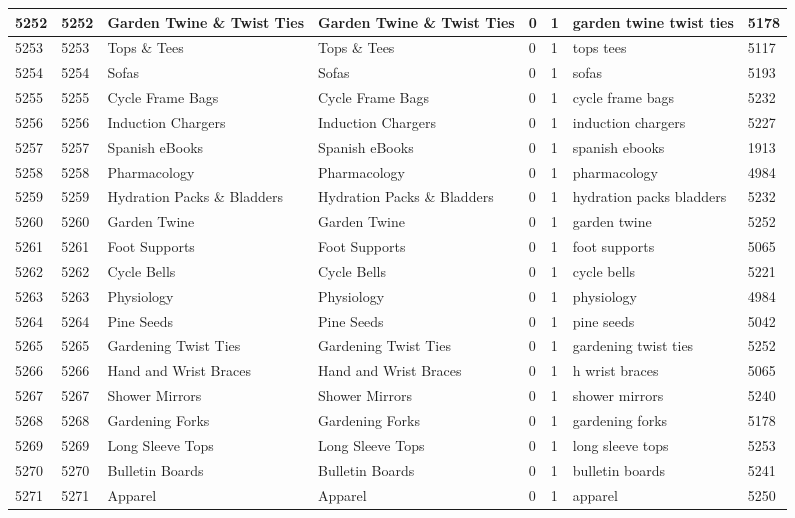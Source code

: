 \begin{longtable}{|l|l|l|l|l|l|l|l|}
5252 & 5252 & Garden Twine \& Twist Ties & Garden Twine \& Twist Ties & 0 & 1 & garden twine twist ties & 5178 \\ \hline 
5253 & 5253 & Tops \& Tees & Tops \& Tees & 0 & 1 & tops tees & 5117 \\ \hline 
5254 & 5254 & Sofas & Sofas & 0 & 1 & sofas & 5193 \\ \hline 
5255 & 5255 & Cycle Frame Bags & Cycle Frame Bags & 0 & 1 & cycle frame bags & 5232 \\ \hline 
5256 & 5256 & Induction Chargers & Induction Chargers & 0 & 1 & induction chargers & 5227 \\ \hline 
5257 & 5257 & Spanish eBooks & Spanish eBooks & 0 & 1 & spanish ebooks & 1913 \\ \hline 
5258 & 5258 & Pharmacology & Pharmacology & 0 & 1 & pharmacology & 4984 \\ \hline 
5259 & 5259 & Hydration Packs \& Bladders & Hydration Packs \& Bladders & 0 & 1 & hydration packs bladders & 5232 \\ \hline 
5260 & 5260 & Garden Twine & Garden Twine & 0 & 1 & garden twine & 5252 \\ \hline 
5261 & 5261 & Foot Supports & Foot Supports & 0 & 1 & foot supports & 5065 \\ \hline 
5262 & 5262 & Cycle Bells & Cycle Bells & 0 & 1 & cycle bells & 5221 \\ \hline 
5263 & 5263 & Physiology & Physiology & 0 & 1 & physiology & 4984 \\ \hline 
5264 & 5264 & Pine Seeds & Pine Seeds & 0 & 1 & pine seeds & 5042 \\ \hline 
5265 & 5265 & Gardening Twist Ties & Gardening Twist Ties & 0 & 1 & gardening twist ties & 5252 \\ \hline 
5266 & 5266 & Hand and Wrist Braces & Hand and Wrist Braces & 0 & 1 & h wrist braces & 5065 \\ \hline 
5267 & 5267 & Shower Mirrors & Shower Mirrors & 0 & 1 & shower mirrors & 5240 \\ \hline 
5268 & 5268 & Gardening Forks & Gardening Forks & 0 & 1 & gardening forks & 5178 \\ \hline 
5269 & 5269 & Long Sleeve Tops & Long Sleeve Tops & 0 & 1 & long sleeve tops & 5253 \\ \hline 
5270 & 5270 & Bulletin Boards & Bulletin Boards & 0 & 1 & bulletin boards & 5241 \\ \hline 
5271 & 5271 & Apparel & Apparel & 0 & 1 & apparel & 5250 \\ \hline 

\end{longtable}
